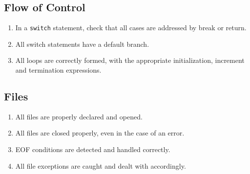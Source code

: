 \documentclass{article}
\begin{document}
\subsection*{Flow of Control}\begin{enumerate}[resume]
\item In a \texttt{switch} statement, check that all cases are addressed by break or return.
\item All switch statements have a default branch.
\item All loops are correctly formed, with the appropriate initialization, increment and termination expressions.
\end{enumerate}

\subsection*{Files}\begin{enumerate}[resume]
\item All files are properly declared and opened.
\item All files are closed properly, even in the case of an error.
\item EOF conditions are detected and handled correctly.
\item All file exceptions are caught and dealt with accordingly.
\end{enumerate}
\end{document}
